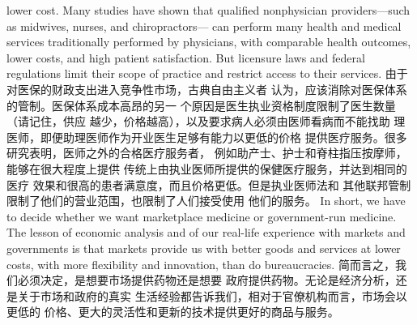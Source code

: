 \begin{paracol}{2}
lower cost. Many studies have shown that qualified nonphysician providers---such as midwives, nurses, and chiropractors---
can perform many health and medical services traditionally
performed by physicians, with comparable health outcomes,
lower costs, and high patient satisfaction. But licensure laws
and federal regulations limit their scope of practice and restrict
access to their services.
\switchcolumn
由于对医保的财政支出进入竞争性市场，古典自由主义者
认为，应该消除对医保体系的管制。医保体系成本高昂的另一
个原因是医生执业资格制度限制了医生数量（请记住，供应
越少，价格越高），以及要求病人必须由医师看病而不能找助
理医师，即便助理医师作为开业医生足够有能力以更低的价格
提供医疗服务。很多研究表明，医师之外的合格医疗服务者，
例如助产士、护士和脊柱指压按摩师，能够在很大程度上提供
传统上由执业医师所提供的保健医疗服务，并达到相同的医疗
效果和很高的患者满意度，而且价格更低。但是执业医师法和
其他联邦管制限制了他们的营业范围，也限制了人们接受使用
他们的服务。
\switchcolumn*
In short, we have to decide whether we want marketplace
medicine or government-run medicine. The lesson of economic
analysis and of our real-life experience with markets and governments is that markets provide us with better goods and services at lower costs, with more flexibility and innovation, than
do bureaucracies.
\switchcolumn
简而言之，我们必须决定，是想要市场提供药物还是想要
政府提供药物。无论是经济分析，还是关于市场和政府的真实
生活经验都告诉我们，相对于官僚机构而言，市场会以更低的
价格、更大的灵活性和更新的技术提供更好的商品与服务。


\end{paracol}
